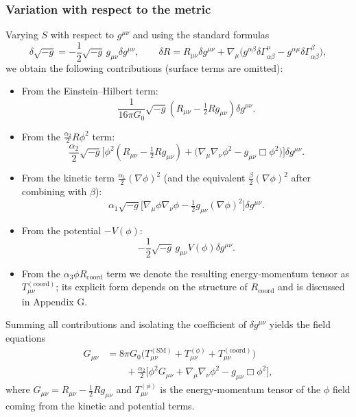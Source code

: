 \documentclass[12pt,a4paper]{article}
\begin{document}
	\subsubsection{Variation with respect to the metric}
	Varying $S$ with respect to $g^{\mu\nu}$ and using the standard formulas
	\[
	\delta\sqrt{-g} = -\frac12\sqrt{-g}\,g_{\mu\nu}\delta g^{\mu\nu},\qquad
	\delta R = R_{\mu\nu}\delta g^{\mu\nu} + \nabla_\mu\big(g^{\alpha\beta}\delta\Gamma^\mu_{\alpha\beta} - g^{\alpha\mu}\delta\Gamma^\beta_{\alpha\beta}\big),
	\]
	we obtain the following contributions (surface terms are omitted):
	\begin{itemize}
		\item From the Einstein–Hilbert term:
		\[
		\frac{1}{16\pi G_0}\sqrt{-g}\left(R_{\mu\nu} - \tfrac12 R g_{\mu\nu}\right)\delta g^{\mu\nu}.
		\]
		\item From the $\frac{\alpha_2}{2}R\phi^2$ term:
		\[
		\frac{\alpha_2}{2}\sqrt{-g}\Big[\phi^2\!\left(R_{\mu\nu} - \tfrac12 R g_{\mu\nu}\right) + \big(\nabla_\mu\nabla_\nu\phi^2 - g_{\mu\nu}\Box\phi^2\big)\Big]\delta g^{\mu\nu}.
		\]
		\item From the kinetic term $\frac{\alpha_1}{2}(\nabla\phi)^2$ (and the equivalent $\frac{\beta}{2}(\nabla\phi)^2$ after combining with $\beta$):
		\[
		\alpha_1\sqrt{-g}\Big[\nabla_\mu\phi\nabla_\nu\phi - \tfrac12 g_{\mu\nu}(\nabla\phi)^2\Big]\delta g^{\mu\nu}.
		\]
		\item From the potential $-V(\phi)$:
		\[
		-\frac12\sqrt{-g}\,g_{\mu\nu}V(\phi)\delta g^{\mu\nu}.
		\]
		\item From the $\alpha_3\phi R_{\text{coord}}$ term we denote the resulting energy‑momentum tensor as $T_{\mu\nu}^{(\text{coord})}$; its explicit form depends on the structure of $R_{\text{coord}}$ and is discussed in Appendix G.
	\end{itemize}
	Summing all contributions and isolating the coefficient of $\delta g^{\mu\nu}$ yields the field equations
	\begin{equation}
		\begin{aligned}
			G_{\mu\nu} &= 8\pi G_0\Big( T_{\mu\nu}^{(\text{SM})} + T_{\mu\nu}^{(\phi)} + T_{\mu\nu}^{(\text{coord})} \Big) \\
			&\qquad + \frac{\alpha_2}{2}\Big[ \phi^2 G_{\mu\nu} + \nabla_\mu\nabla_\nu\phi^2 - g_{\mu\nu}\Box\phi^2 \Big],
		\end{aligned}
		\label{eq:field-eqn-raw}
	\end{equation}
	where $G_{\mu\nu}=R_{\mu\nu}-\frac12 R g_{\mu\nu}$ and $T_{\mu\nu}^{(\phi)}$ is the energy‑momentum tensor of the $\phi$ field coming from the kinetic and potential terms.
	
\end{document}
